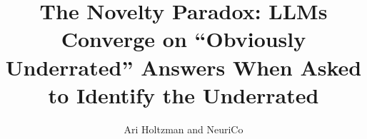 \documentclass{article}
\title{The Novelty Paradox: LLMs Converge on ``Obviously Underrated'' Answers When Asked to Identify the Underrated}
\author{Ari Holtzman and NeuriCo}
\begin{document}
\maketitle

\begin{abstract}

\end{abstract}










\end{document}
